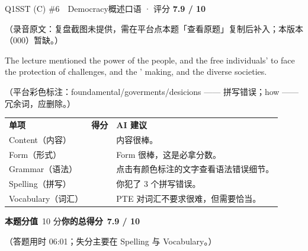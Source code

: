 \begin{qblock}{Q1\quad SST (C) \#6\ \ Democracy}{概述口语 · 评分 \textcolor{cAccent}{\bfseries 7.9 / 10}}
\begin{promptbox}
{\color{cWrong}（录音原文：复盘截图未提供，需在平台点本题「查看原题」复制后补入；本版本（000）暂缺。）}
\end{promptbox}
\begin{youbox}
The lecture mentioned the power of the people, and the free individuals'  to face the protection of  challenges, and the '  making, and the diverse societies.
\end{youbox}
{\footnotesize\color{gray}（平台彩色标注：foundamental/goverments/desicions —— 拼写错误；how —— 冗余词，应删除。）}
\begin{notebox}
{\renewcommand{\arraystretch}{1.35}
\begin{tabularx}{\linewidth}{@{}l c Z@{}}
\textbf{单项} & \textbf{得分} & \textbf{AI 建议}\\[2pt]
Content（内容）&  & 内容很棒。\\
Form（形式）&  & Form 很棒，这是必拿分数。\\
Grammar（语法）&  & 点击有颜色标注的文字查看语法错误细节。\\
Spelling（拼写）&  & 你犯了 3 个拼写错误。\\
Vocabulary（词汇）&  & PTE 对词汇不要求很难，但需要恰当。\\
\end{tabularx}}
\smallskip
\textbf{本题分值}\ 10 分\qquad\textbf{你的总得分}\ \textcolor{cAccent}{\bfseries 7.9 / 10}
\end{notebox}
\smallskip
{\footnotesize\color{gray}（答题用时 06:01；失分主要在 Spelling 与 Vocabulary。）}
\end{qblock}

